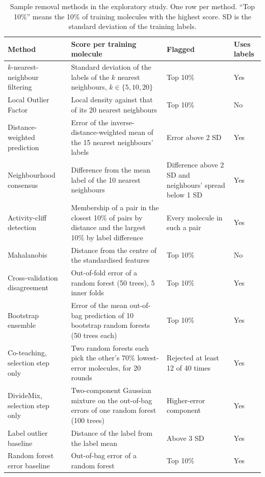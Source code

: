 \begin{table}[htbp]
\centering
\small
\caption{Sample removal methods in the exploratory study. One row per method. ``Top 10\%'' means the 10\% of training molecules with the highest score. SD is the standard deviation of the training labels.}
\label{tab:removal_methods}
\begin{tabular}{p{2.6cm}p{5.6cm}p{3.2cm}p{1.1cm}}
\toprule
Method & Score per training molecule & Flagged & Uses labels \\
\midrule
$k$-nearest-neighbour filtering \citep{Wilson1972} & Standard deviation of the labels of the $k$ nearest neighbours, $k \in \{5, 10, 20\}$ & Top 10\% & Yes \\
\addlinespace
Local Outlier Factor \citep{Breunig2000} & Local density against that of its 20 nearest neighbours & Top 10\% & No \\
\addlinespace
Distance-weighted prediction & Error of the inverse-distance-weighted mean of the 15 nearest neighbours' labels & Error above 2 SD & Yes \\
\addlinespace
Neighbourhood consensus & Difference from the mean label of the 10 nearest neighbours & Difference above 2 SD and neighbours' spread below 1 SD & Yes \\
\addlinespace
Activity-cliff detection & Membership of a pair in the closest 10\% of pairs by distance and the largest 10\% by label difference & Every molecule in such a pair & Yes \\
\addlinespace
Mahalanobis & Distance from the centre of the standardised features & Top 10\% & No \\
\addlinespace
Cross-validation disagreement \citep{Brodley1999} & Out-of-fold error of a random forest (50 trees), 5 inner folds & Top 10\% & Yes \\
\addlinespace
Bootstrap ensemble & Error of the mean out-of-bag prediction of 10 bootstrap random forests (50 trees each) & Top 10\% & Yes \\
\addlinespace
Co-teaching, selection step only \citep{Han2018} & Two random forests each pick the other's 70\% lowest-error molecules, for 20 rounds & Rejected at least 12 of 40 times & Yes \\
\addlinespace
DivideMix, selection step only \citep{li2020} & Two-component Gaussian mixture on the out-of-bag errors of one random forest (100 trees) & Higher-error component & Yes \\
\addlinespace
Label outlier baseline & Distance of the label from the label mean & Above 3 SD & Yes \\
\addlinespace
Random forest error baseline & Out-of-bag error of a random forest & Top 10\% & Yes \\
\bottomrule
\end{tabular}
\end{table}

